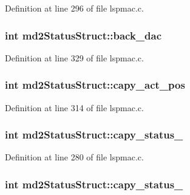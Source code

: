 Definition at line 296 of file lspmac.\-c.

\hypertarget{structmd2StatusStruct_a33ce490348c8de255cf49b96469d3d4e}{
\subsubsection[{back\-\_\-dac}]{\setlength{\rightskip}{0pt plus 5cm}int md2\-Status\-Struct\-::back\-\_\-dac}}\label{structmd2StatusStruct_a33ce490348c8de255cf49b96469d3d4e}


Definition at line 329 of file lspmac.\-c.

\hypertarget{structmd2StatusStruct_ae25122a6db146501b51609b9cb59b044}{
\subsubsection[{capy\-\_\-act\-\_\-pos}]{\setlength{\rightskip}{0pt plus 5cm}int md2\-Status\-Struct\-::capy\-\_\-act\-\_\-pos}}\label{structmd2StatusStruct_ae25122a6db146501b51609b9cb59b044}


Definition at line 314 of file lspmac.\-c.

\hypertarget{structmd2StatusStruct_a7f4e945e80b1980b9e69366a69ad79cc}{
\subsubsection[{capy\-\_\-status\-\_\-1}]{\setlength{\rightskip}{0pt plus 5cm}int md2\-Status\-Struct\-::capy\-\_\-status\-\_}}\label{structmd2StatusStruct_a7f4e945e80b1980b9e69366a69ad79cc}


Definition at line 280 of file lspmac.\-c.

\hypertarget{structmd2StatusStruct_a5d7c10d9a16ebcc53ac4a0770ab2ef62}{
\subsubsection[{capy\-\_\-status\-\_\-2}]{\setlength{\rightskip}{0pt plus 5cm}int md2\-Status\-Struct\-::capy\-\_\-status\-\_}}\label{structmd2StatusStruct_a5d7c10d9a16ebcc53ac4a0770ab2ef62}


